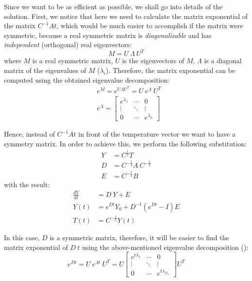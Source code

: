 Since we want to be as efficient as possible, we shall go into details of the solution. First, we notice that here we need to calculate the matrix exponential of the matrix $C^{-1} A t$, which would be much easier to accomplish if the matrix were symmetric, because a real symmetric matrix is \emph{diagonalizable} and has \emph{independent} (orthogonal) real eigenvectors:
\begin{equation} \label{eq:eigenvalue-decomposition}
  M = U \: \Lambda \: U^T
\end{equation}
where $M$ is a real symmetric matrix, $U$ is the eigenvectors of $M$, $\Lambda$ is a diagonal matrix of the eigenvalues of $M$ ($\lambda_i$). Therefore, the matrix exponential can be computed using the obtained eigenvalue decomposition:
\begin{align}
  & e^M = e^{U \Lambda U^T} = U \: e^{\Lambda} \: U^T \nonumber \\
  & e^{\Lambda} = \left[
      \begin{array}{ccc}
        e^{\lambda_1} & \cdots & 0 \\
        \vdots & \ddots & \vdots \\
        0 & \cdots & e^{\lambda_{n}}
      \end{array}
    \right] \nonumber
\end{align}

Hence, instead of $C^{-1} A t$ in front of the temperature vector we want to have a symmetry matrix. In order to achieve this, we perform the following substitution:
\begin{align*}
  Y & = C^{\frac{1}{2}} T \\
  D & = C^{-\frac{1}{2}} A \: C^{-\frac{1}{2}} \\
  E & = C^{-\frac{1}{2}} B
\end{align*}
with the result:
\begin{align}
  \frac{dY}{dt} & = D \: Y + E \nonumber \\
  Y(t) & = e^{D t} Y_0 + D^{-1} (e^{D t} - I) E \label{eq:modified-solution} \\
  T(t) & = C^{-\frac{1}{2}} Y(t) \nonumber
\end{align}

In this case, $D$ is a symmetric matrix, therefore, it will be easier to find the matrix exponential of $D \: t$ using the above-mentioned eigenvalue decomposition ():
\[
  e^{D t} = U \: e^{\Lambda t} \: U^T = U \left[
      \begin{array}{ccc}
        e^{t \lambda_1} & \cdots & 0 \\
        \vdots & \ddots & \vdots \\
        0 & \cdots & e^{t \lambda_{N_n}}
      \end{array}
    \right] U^T
\]

